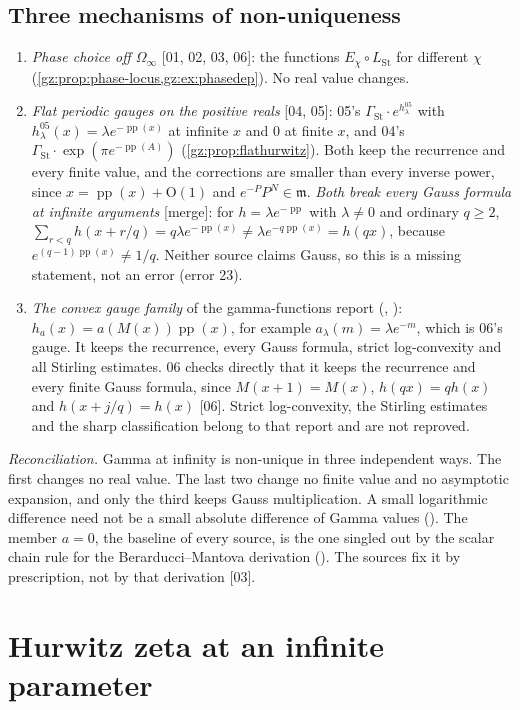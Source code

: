 \documentclass[11pt,a4paper]{article}
\numberwithin{equation}{section}
\theoremstyle{definition}
\theoremstyle{remark}
\newcommand{\mm}{\mathfrak m}
\newcommand{\pp}{\operatorname{pp}}
\newcommand{\LSt}{L_{\mathrm{St}}}
\newcommand{\GSt}{\Gamma_{\mathrm{St}}}
\newcommand{\Om}{\Omega_{\infty}}
\newcommand{\src}[1]{\textup{[#1]}}
\newcommand{\merge}{\textup{[merge]}}
\newcommand{\bigO}{\mathrm{O}}
\begin{document}
\subsection{Three mechanisms of non-uniqueness}\label{gz:sec:nonunique}
\begin{enumerate}[label=(\arabic*)]
\item \emph{Phase choice off $\Om$} \src{01, 02, 03, 06}: the functions
 $E_\chi\circ\LSt$ for different $\chi$
 (\cref{gz:prop:phase-locus,gz:ex:phasedep}). No real value changes.
\item \emph{Flat periodic gauges on the positive reals} \src{04, 05}: 05's
 $\GSt\cdot e^{h^{05}_\lambda}$ with $h^{05}_\lambda(x)=\lambda e^{-\pp(x)}$
 at infinite $x$ and $0$ at finite $x$, and 04's $\GSt\cdot\exp(\pi e^{-\pp(A)})$
 (\cref{gz:prop:flathurwitz}). Both keep the recurrence and every finite
 value, and the corrections are smaller than every inverse power, since
 $x=\pp(x)+\bigO(1)$ and $e^{-P}P^N\in\mm$. \emph{Both break every Gauss
 formula at infinite arguments} \merge: for $h=\lambda e^{-\pp}$ with
 $\lambda\ne0$ and ordinary $q\ge2$,
 $\sum_{r<q}h(x+r/q)=q\lambda e^{-\pp(x)}\ne\lambda e^{-q\pp(x)}=h(qx)$,
 because $e^{(q-1)\pp(x)}\ne1/q$. Neither source claims Gauss, so this is a
 missing statement, not an error (error 23).
\item \emph{The convex gauge family} of the gamma-functions report
 (, ): $h_a(x)=a(M(x))\pp(x)$, for example
 $a_\lambda(m)=\lambda e^{-m}$, which is 06's gauge. It keeps the recurrence,
 every Gauss formula, strict log-convexity and all Stirling estimates.
 06 checks directly that it keeps the recurrence and every finite Gauss
 formula, since $M(x+1)=M(x)$, $h(qx)=qh(x)$ and $h(x+j/q)=h(x)$ \src{06}.
 Strict log-convexity, the Stirling estimates and the sharp
 classification belong to that report and are not reproved.
\end{enumerate}
\emph{Reconciliation.} Gamma at infinity is non-unique in three independent
ways. The first changes no real value. The last two change no finite value
and no asymptotic expansion, and only the third keeps Gauss multiplication.
A small logarithmic difference need not be a small absolute difference of
Gamma values (). The member $a=0$, the
baseline of every source, is the one singled out by the scalar chain rule
for the Berarducci--Mantova derivation (). The sources fix
it by prescription, not by that derivation \src{03}.

\section{Hurwitz zeta at an infinite parameter}\label{gz:sec:hurwitz}
\end{document}
